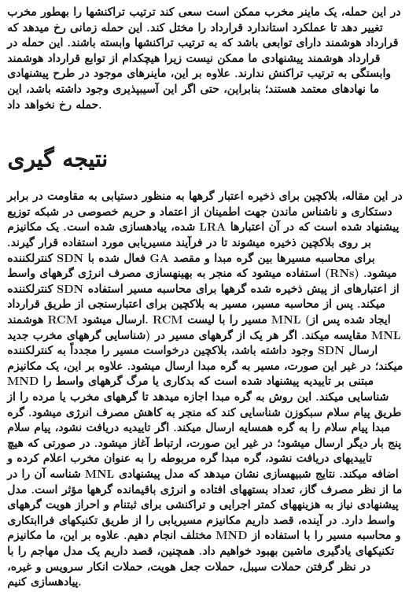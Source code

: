 \documentclass{article} %
\begin{document}
\noindent 
{\bf در این حمله، یک ماینر مخرب ممکن است سعی کند ترتیب تراکنشها را بهطور مخرب تغییر دهد تا عملکرد استاندارد قرارداد را مختل کند. این حمله زمانی رخ میدهد که قرارداد هوشمند دارای توابعی باشد که به ترتیب تراکنشها وابسته باشند. این حمله در قرارداد هوشمند پیشنهادی ما ممکن نیست زیرا هیچکدام از توابع قرارداد هوشمند وابستگی به ترتیب تراکنش ندارند. علاوه بر این، ماینرهای موجود در طرح پیشنهادی ما نهادهای معتمد هستند؛ بنابراین، حتی اگر این آسیبپذیری وجود داشته باشد، این حمله رخ نخواهد داد.}


\section{ نتیجه گیری }

\noindent 
{\bf در این مقاله، بلاکچین برای ذخیره اعتبار گرهها به منظور دستیابی به مقاومت در برابر دستکاری و ناشناس ماندن جهت اطمینان از اعتماد و حریم خصوصی در شبکه توزیع شده، پیادهسازی شده است. یک مکانیزم LRA پیشنهاد شده است که در آن اعتبارها بر روی بلاکچین ذخیره میشوند تا در فرآیند مسیریابی مورد استفاده قرار گیرند. کنترلکننده SDN فعال شده با GA برای محاسبه مسیرها بین گره مبدا و مقصد استفاده میشود که منجر به بهینهسازی مصرف انرژی گرههای واسط (RNs) میشود. کنترلکننده SDN از اعتبارهای از پیش ذخیره شده گرهها برای محاسبه مسیر استفاده میکند. پس از محاسبه مسیر، مسیر به بلاکچین برای اعتبارسنجی از طریق قرارداد هوشمند RCM ارسال میشود. RCM مسیر را با لیست MNL (ایجاد شده پس از شناسایی گرههای مخرب جدید) مقایسه میکند. اگر هر یک از گرههای مسیر در MNL وجود داشته باشد، بلاکچین درخواست مسیر را مجدداً به کنترلکننده SDN ارسال میکند؛ در غیر این صورت، مسیر به گره مبدا ارسال میشود. علاوه بر این، یک مکانیزم MND مبتنی بر تاییدیه پیشنهاد شده است که بدکاری یا مرگ گرههای واسط را شناسایی میکند. این روش به گره مبدا اجازه میدهد تا گرههای مخرب یا مرده را از طریق پیام سلام سبکوزن شناسایی کند که منجر به کاهش مصرف انرژی میشود. گره مبدا پیام سلام را به گره همسایه ارسال میکند. اگر تاییدیه دریافت نشود، پیام سلام پنج بار دیگر ارسال میشود؛ در غیر این صورت، ارتباط آغاز میشود. در صورتی که هیچ تاییدیهای دریافت نشود، گره مبدا گره مربوطه را به عنوان مخرب اعلام کرده و شناسه آن را در MNL اضافه میکند. نتایج شبیهسازی نشان میدهد که مدل پیشنهادی ما از نظر مصرف گاز، تعداد بستههای افتاده و انرژی باقیمانده گرهها مؤثر است. مدل پیشنهادی نیاز به هزینههای کمتر اجرایی و تراکنشی برای ثبتنام و احراز هویت گرههای واسط دارد. در آینده، قصد داریم مکانیزم مسیریابی را از طریق تکنیکهای فراابتکاری مختلف انجام دهیم. علاوه بر این، ما مکانیزم MND و محاسبه مسیر را با استفاده از تکنیکهای یادگیری ماشین بهبود خواهیم داد. همچنین، قصد داریم یک مدل مهاجم را با در نظر گرفتن حملات سیبل، حملات جعل هویت، حملات انکار سرویس و غیره، پیادهسازی کنیم.}
\end{document}
